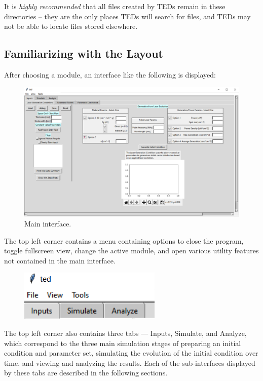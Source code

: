 \documentclass[11pt,letterpaper,titlepage]{article}
\begin{document}
		\par
		It is \textit{highly recommended} that all files created by TEDs remain in these directories – they are the only places TEDs will search for files, and TEDs may not be able to locate files stored elsewhere.
		
		\subsection{Familiarizing with the Layout}
		
		\par
		After choosing a module, an interface like the following is displayed:
		\begin{figure}[H]
			\label{fig:main_interface}
			\centering
			\includegraphics[scale=0.4]{"main_interface"}
			\caption{Main interface.}
		\end{figure}
	
	    \par
	    The top left corner contains a menu containing options to close the program, toggle fullscreen view, change the active module, and open various utility features not contained in the main interface.
	    
	    \begin{figure}[H]
	    	\label{fig:top_left_menu}
	    	\centering
	    	\includegraphics[scale=1]{"top_left_menu"}
	    \end{figure}
	    
	    \par
	    The top left corner also contains three tabs — Inputs, Simulate, and Analyze, which correspond to the three main simulation stages of preparing an initial condition and parameter set, simulating the evolution of the initial condition over time, and viewing and analyzing the results. Each of the sub-interfaces displayed by these tabs are described in the following sections.
	    
\end{document}
